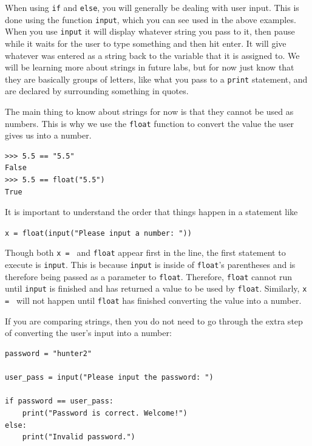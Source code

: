 \documentclass[11pt]{cselabheader}
\begin{document}
When using \lstinline{if} and \lstinline{else}, you will generally be dealing
with user input. This is done using the function \lstinline{input}, which you
can see used in the above examples. When you use \lstinline{input} it will
display whatever string you pass to it, then pause while it waits for the user
to type something and then hit enter. It will give whatever was entered as a
string back to the variable that it is assigned to. We will be learning more
about strings in future labs, but for now just know that they are basically
groups of letters, like what you pass to a \lstinline{print} statement, and are
declared by surrounding something in quotes.

The main thing to know about strings for now is that they cannot be used as
numbers. This is why we use the \lstinline{float} function to convert the value
the user gives us into a number.

\begin{lstlisting}[style=ipython]
>>> 5.5 == "5.5"
False
>>> 5.5 == float("5.5")
True
\end{lstlisting}

It is important to understand the order that things happen in a statement like

\lstinline{x = float(input("Please input a number: "))}

Though both \lstinline{x = } and \lstinline{float} appear first in the line, the
first statement to execute is \lstinline{input}. This is because
\lstinline{input} is inside of \lstinline{float}'s parentheses and is therefore
being passed as a parameter to \lstinline{float}. Therefore, \lstinline{float}
cannot run until \lstinline{input} is finished and has returned a value to be
used by \lstinline{float}. Similarly, \lstinline{x = } will not happen until
\lstinline{float} has finished converting the value into a number.

If you are comparing strings, then you do not need to go through the extra step
of converting the user's input into a number:

\begin{lstlisting}[style=python]
password = "hunter2"

user_pass = input("Please input the password: ")

if password == user_pass:
    print("Password is correct. Welcome!")
else:
    print("Invalid password.")
\end{lstlisting}
\end{document}
